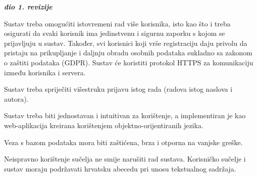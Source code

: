 			\textbf{\textit{dio 1. revizije}}\\
		 
			 \begin{packed_item}

				\item Sustav treba omogućiti istovremeni rad više korisnika, isto kao što i treba osigurati da svaki korisnik ima jedinstvenu i sigurnu zaporku s kojom se prijavljuju u sustav. Također, svi korisnici koji vrše registraciju daju privolu da pristaju na prikupljanje i daljnju obradu osobnih podataka sukladno sa zakonom o zaštiti podataka (GDPR). Sustav će koristiti protokol HTTPS za komunikaciju između korisnika i servera.
				\item Sustav treba spriječiti višestruku prijavu istog rada (radova istog naslova i autora).
				\item Sustav treba biti jednostavan i intuitivan za korištenje, a implementiran je kao web-aplikacija kreirana korištenjem objektno-orijentiranih jezika.
				\item Veza s bazom podataka mora biti zaštićena, brza i otporna na vanjske greške.
				\item Neispravno korištenje sučelja ne smije narušiti rad sustava. Korisničko sučelje i sustav moraju podržavati hrvatsku abecedu pri unosu tekstualnog sadržaja.

			\end{packed_item}
			 
			 
			 
	